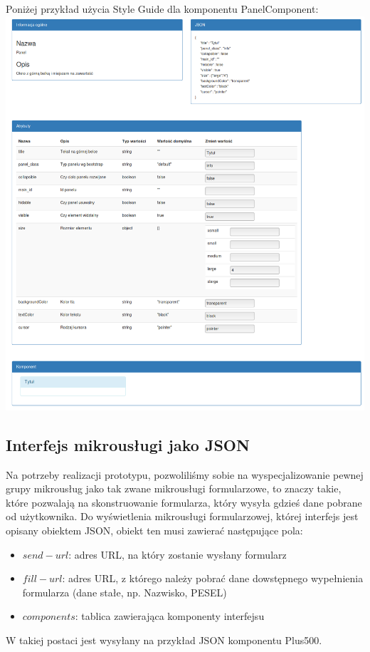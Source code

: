 \documentclass[licencjacka]{pracamgr}
\begin{document}
Poniżej przykład użycia Style Guide dla komponentu PanelComponent: \\
\includegraphics[width=\textwidth]{obrazki/styleguide.png}

\subsection{Interfejs mikrousługi jako JSON}
Na potrzeby realizacji prototypu, pozwoliliśmy sobie na wyspecjalizowanie pewnej grupy mikrousług jako tak zwane mikrousługi formularzowe, to znaczy takie, które pozwalają na skonstruowanie formularza, który wysyła gdzieś dane pobrane od użytkownika.
Do wyświetlenia mikrousługi formularzowej, której interfejs jest opisany obiektem JSON, obiekt ten musi zawierać następujące pola:
\begin{itemize}
	\item $send-url$: adres URL, na który zostanie wysłany formularz
	\item $fill-url$: adres URL, z którego należy pobrać dane dowstępnego wypełnienia formularza (dane stałe, np. Nazwisko, PESEL)
	\item $components$: tablica zawierająca komponenty interfejsu
\end{itemize}
W takiej postaci jest wysyłany na przykład JSON komponentu Plus500.
\end{document}
